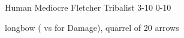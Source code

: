 
\begin{filledCS}%
  {\composeHumanName}%
  {Human}%
  {Mediocre Fletcher}%
  {Tribalist}%
  {{3}{-1}{0}}%
  {{0}{-1}{0}}%
  {%
    \setcounter{Athletics}{1}
    \setcounter{Crafts}{2}
    \setcounter{Cultivation}{1}
    \setcounter{Empathy}{1}
    \setcounter{Survival}{1}

    \setcounter{Projectiles}{1}
    \greatsword
    \partialchain
    \addtocounter{equipmentWeight}{3}
  }%
  {\guardian}%
  {longbow {\footnotesize( vs  for  Damage)}, quarrel of 20 arrows}%
  \renewcommand\rank{Fodder}
  \renewcommand\characterDebt{100 \glspl{sp}}


\end{filledCS}

